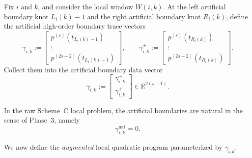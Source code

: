 Fix \(i\) and \(k\), and consider the local window \(W(i,k)\).
At the left artificial boundary knot \(L_i(k)-1\) and the right artificial boundary knot \(R_i(k)\), define the artificial high-order boundary trace vectors
\begin{equation}
\label{eq:phase8_gamma_left_right}
\gamma^-_{i,k}
:=
\begin{bmatrix}
p^{(s)}(t_{L_i(k)-1})\\
\vdots\\
p^{(2s-2)}(t_{L_i(k)-1})
\end{bmatrix},
\qquad
\gamma^+_{i,k}
:=
\begin{bmatrix}
p^{(s)}(t_{R_i(k)})\\
\vdots\\
p^{(2s-2)}(t_{R_i(k)})
\end{bmatrix}.
\end{equation}
Collect them into the artificial boundary data vector
\begin{equation}
\label{eq:phase8_gamma}
\gamma_{i,k}
:=
\begin{bmatrix}
\gamma^-_{i,k}\\
\gamma^+_{i,k}
\end{bmatrix}
\in\mathbb R^{2(s-1)}.
\end{equation}

In the raw Scheme~C local problem, the artificial boundaries are natural in the sense of Phase~3, namely
\begin{equation}
\label{eq:phase8_gamma_nat}
\gamma_{i,k}^{\mathrm{nat}}=0.
\end{equation}

We now define the \emph{augmented} local quadratic program parameterized by \(\gamma_{i,k}\).

